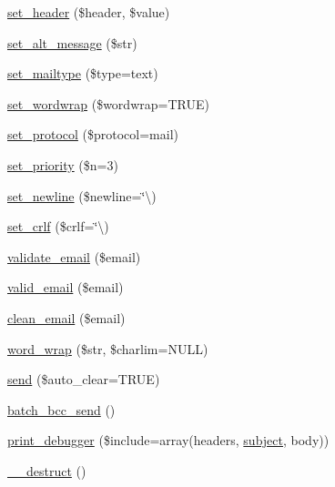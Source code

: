 \begin{DoxyCompactItemize}
\mbox{\hyperlink{class_c_i___email_a0d30433cc57714fb2fb3d49b3587a40f}{set\+\_\+header}} (\$header, \$value)
\item 
\mbox{\hyperlink{class_c_i___email_a62b950aaae2d043d96dfa0cbfdf0043f}{set\+\_\+alt\+\_\+message}} (\$str)
\item 
\mbox{\hyperlink{class_c_i___email_a7a1f80002a6575adda9436fd0fd85055}{set\+\_\+mailtype}} (\$type=\textquotesingle{}text\textquotesingle{})
\item 
\mbox{\hyperlink{class_c_i___email_a14b63cc85319c9ac0cccd7671904758b}{set\+\_\+wordwrap}} (\$wordwrap=T\+R\+UE)
\item 
\mbox{\hyperlink{class_c_i___email_a747658786f90d1e9c16cab7e962407ad}{set\+\_\+protocol}} (\$protocol=\textquotesingle{}mail\textquotesingle{})
\item 
\mbox{\hyperlink{class_c_i___email_a4ff56cbd411a4ac7539a0ca867ea86d3}{set\+\_\+priority}} (\$n=3)
\item 
\mbox{\hyperlink{class_c_i___email_a78022b6d42b16aa9a8bb44304e030c8d}{set\+\_\+newline}} (\$newline=\char`\"{}\textbackslash{})
\item 
\mbox{\hyperlink{class_c_i___email_a6dfb979e61ae39ae59c332c693925850}{set\+\_\+crlf}} (\$crlf=\char`\"{}\textbackslash{})
\item 
\mbox{\hyperlink{class_c_i___email_a48cc8afa8d64719dc0fc3bd9d5a90478}{validate\+\_\+email}} (\$email)
\item 
\mbox{\hyperlink{class_c_i___email_a16cb31939d180f30082151393b7ee676}{valid\+\_\+email}} (\$email)
\item 
\mbox{\hyperlink{class_c_i___email_adbb20aca93d51d34e229f08708e08f40}{clean\+\_\+email}} (\$email)
\item 
\mbox{\hyperlink{class_c_i___email_a71c58d5d3015802c544fcdea46c19e1e}{word\+\_\+wrap}} (\$str, \$charlim=N\+U\+LL)
\item 
\mbox{\hyperlink{class_c_i___email_ac12eec458a55c8164beaa35e78aae730}{send}} (\$auto\+\_\+clear=T\+R\+UE)
\item 
\mbox{\hyperlink{class_c_i___email_a8924024b733a015d3bb31f86436e5c87}{batch\+\_\+bcc\+\_\+send}} ()
\item 
\mbox{\hyperlink{class_c_i___email_a33fc71767a8375f1a120826609f8175b}{print\+\_\+debugger}} (\$include=array(\textquotesingle{}headers\textquotesingle{}, \textquotesingle{}\mbox{\hyperlink{class_c_i___email_a14795b95ebaa3941a2c5a11ee7ddbeae}{subject}}\textquotesingle{}, \textquotesingle{}body\textquotesingle{}))
\item 
\mbox{\hyperlink{class_c_i___email_a64e5a805b2fd3dee6313111e63696ab8}{\+\_\+\+\_\+destruct}} ()
\end{DoxyCompactItemize}
